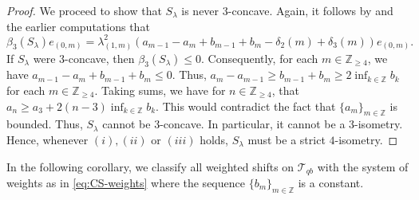 \documentclass[11pt, reqno, a4paper]{amsart}
\theoremstyle{definition}
\newcommand{\scrT}{{\mathscr T}}
\renewcommand{\le}{\leqslant}
\renewcommand{\ge}{\geqslant}
\renewcommand{\leq}{\leqslant}
\renewcommand{\geq}{\geqslant}
\newcommand{\Z}{\mathbb Z}
\numberwithin{equation}{section}
\begin{document}
\begin{proof}
        We proceed to show that $S_\lambda$ is never $3$-concave. Again, it follows by  and the earlier computations that 
            \begin{equation*}
                \beta_3(S_\lambda)e_{(0,m)} = \lambda_{(1,m)}^2 \left( a_{m-1}-a_m+b_{m-1}+b_m -\delta_2(m)+\delta_3(m) \right)e_{(0,m)}.
            \end{equation*}
        If $S_\lambda$ were $3$-concave, then $\beta_3(S_\lambda)\leq0$. Consequently, for each $m \in \Z_{\ge 4}$, we have $a_{m-1}-a_m+b_{m-1}+b_m\le0$. Thus, $a_m-a_{m-1} \ge b_{m-1}+b_m \ge 2\inf_{k\in\Z}b_k$ for each $m \in \Z_{\ge 4}$. Taking sums, we have for $n \in \Z_{\ge 4}$, that $a_n \geq a_3+2(n-3)\inf_{k\in\Z}b_k$. This would contradict the fact that $\{ a_m \}_{m \in \Z}$ is bounded. Thus, $S_{\lambda}$ cannot be $3$-concave. In particular, it cannot be a $3$-isometry. Hence, whenever $(i), (ii)$ or $(iii)$ holds, $S_{\lambda}$ must be a strict $4$-isometry.
    \end{proof}

    In the following corollary, we classify all weighted shifts on $\scrT_{qb}$ with the system of weights as in \eqref{eq:CS-weights} where the sequence $\{ b_m \}_{m \in \Z}$ is a constant.
\end{document}
